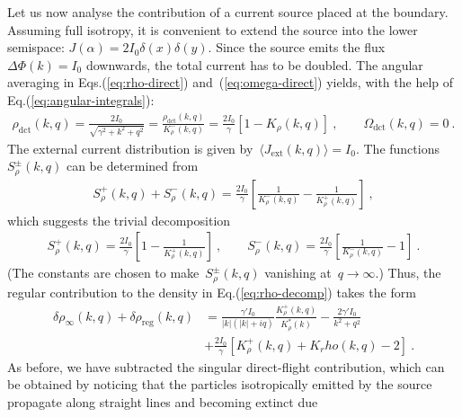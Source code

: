 \documentclass[preprint,aps,eqsecnum, prb]{revtex4-1}
\newcommand{\fplus}[1]{{#1}^{+}}
\newcommand{\fminus}[1]{{#1}^{-}}
\newcommand{\fplusminus}[1]{{#1}^{\pm}}
\newcommand{\dct}[1]{{#1}_\mathrm{dct}}
\begin{document}
Let us now analyse the contribution of a current source placed at the boundary.
Assuming full isotropy, it is convenient to
extend the source into the lower semispace:
$J(\alpha) = 2I_0 \delta(x) \delta(y)$. Since the source
emits the flux~$\Delta \Phi(k) = I_0$ downwards, the total
current has to be doubled.
The angular averaging in Eqs.(\ref{eq:rho-direct}) and~(\ref{eq:omega-direct})
yields, with the help of Eq.(\ref{eq:angular-integrals}):
\begin{align}
  \label{eq:I-src-rho-omega}
  \dct{\rho}(k, q) = \frac{2I_0}{\sqrt{\gamma^2 + k^2 + q^2}} =
  \frac{\dct{\rho}(k, q)}{\fminus{K}_\rho(k, q)} =
  \frac{2I_0}{\gamma} \left[1 - K_\rho(k, q)\right]\ ,
  \qquad
  \dct{\Omega}(k, q) = 0\ .
\end{align}
The external current distribution is
given by~$\langle J_\mathrm{ext}(k, q) \rangle = I_0$.
The functions~$\fplusminus{S}_\rho(k, q)$ can be determined from
\begin{align}
    \fplus{S}_\rho(k, q)
 +  \fminus{S}_\rho(k, q)
  = \frac{2I_0}{\gamma} \left[\frac{1}{\fminus{K}_\rho(k, q)}
  - \frac{1}{\fplus{K}_\rho(k, q)}\right]\ ,
\end{align}
which suggests the trivial decomposition
\begin{align}
  \label{eq:iso-chi}
  \fplus{S}_\rho(k, q) = \frac{2I_0}{\gamma}
  \left[1 - \frac{1}{\fplus{K}_\rho(k, q)}\right]\ ,
  \qquad
  \fminus{S}_\rho(k, q) = \frac{2I_0}{\gamma}
  \left[\frac{1}{\fminus{K}_\rho(k, q)} - 1\right]\ .
\end{align}
(The constants are chosen to make~$\fplusminus{S}_\rho(k, q)$
vanishing at~$q\to\infty$.) Thus, the regular contribution
to the density in Eq.(\ref{eq:rho-decomp}) takes the form
\begin{align}
  \label{eq:iso-rho-reg}
  \delta\rho_\infty(k, q) + \delta\rho_\mathrm{reg}(k, q) &=
  \frac{\gamma' I_0}{|k|(|k| + iq)} \frac{\fplus{K}_\rho(k, q)}{
  K^\ast_{\rho}(k)}
  - \frac{2\gamma' I_0}{k^2 + q^2} \\ \nonumber
   & + \frac{2I_0}{\gamma}
     \left[\fplus{K}_\rho(k, q) + K_rho(k, q) - 2\right] \ .
\end{align}
As before, we have subtracted the singular direct-flight contribution,
which can be obtained by noticing that the particles isotropically emitted by
the source propagate along straight lines and becoming extinct due
\end{document}

